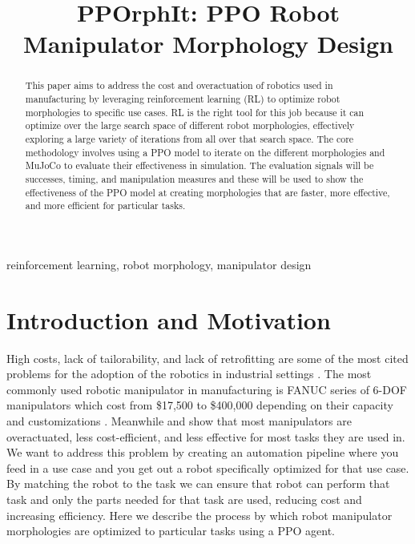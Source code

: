 \documentclass[conference]{IEEEtran}
\begin{document}
\title{PPOrphIt: PPO Robot Manipulator Morphology Design}

\author{
\and
{}
}

\maketitle

\begin{abstract}
This paper aims to address the cost and overactuation of robotics used in manufacturing by leveraging reinforcement learning (RL) to optimize robot morphologies to specific use cases.
RL is the right tool for this job because it can optimize over the large search space of different robot morphologies, effectively exploring a large variety of iterations from all over that search space.
The core methodology involves using a PPO model to iterate on the different morphologies and MuJoCo to evaluate their effectiveness in simulation.
The evaluation signals will be successes, timing, and manipulation measures and these will be used to show the effectiveness of the PPO model at creating morphologies that are faster, more effective, and more efficient for particular tasks.
\end{abstract}

\begin{IEEEkeywords}
reinforcement learning, robot morphology, manipulator design
\end{IEEEkeywords}

\section{Introduction and Motivation}
High costs, lack of tailorability, and lack of retrofitting are some of the most cited problems for the adoption of the robotics in industrial settings \cite{mckinsey2019industrial}.
The most commonly used robotic manipulator in manufacturing is FANUC series of 6-DOF manipulators which cost from \$17,500 to \$400,000 depending on their capacity and customizations \cite{standardbots2025fanucprice}\cite{patentpc2025toprobotics}.
Meanwhile \cite{russo2021task} and \cite{he2019underactuated} show that most manipulators are overactuated, less cost-efficient, and less effective for most tasks they are used in.
We want to address this problem by creating an automation pipeline where you feed in a use case and you get out a robot specifically optimized for that use case.
By matching the robot to the task we can ensure that robot can perform that task and only the parts needed for that task are used, reducing cost and increasing efficiency.
Here we describe the process by which robot manipulator morphologies are optimized to particular tasks using a PPO agent.
\end{document}
